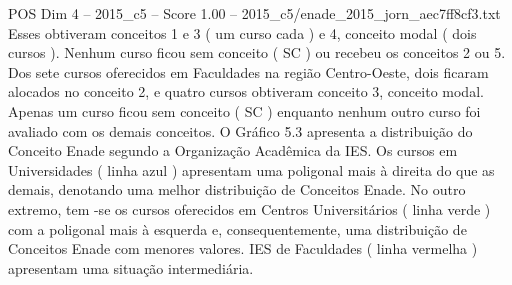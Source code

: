 \begin{textsample}{POS Dim 4 – 2015\_c5 – Score 1.00 – 2015\_c5/enade\_2015\_jorn\_aec7ff8cf3.txt}
Esses obtiveram conceitos 1 e 3 ( um curso cada ) e 4, conceito modal ( dois cursos ).
Nenhum curso ficou sem conceito ( SC ) ou recebeu os conceitos 2 ou 5.
Dos sete cursos oferecidos em Faculdades na região Centro-Oeste, dois ficaram alocados no conceito 2, e quatro cursos obtiveram conceito 3, conceito modal.
Apenas um curso ficou sem conceito ( SC ) enquanto nenhum outro curso foi avaliado com os demais conceitos.
O Gráfico 5.3 apresenta a distribuição do Conceito Enade segundo a Organização Acadêmica da IES.
Os cursos em Universidades ( linha azul ) apresentam uma poligonal mais à direita do que as demais, denotando uma melhor distribuição de Conceitos Enade.
No outro extremo, tem -se os cursos oferecidos em Centros Universitários ( linha verde ) com a poligonal mais à esquerda e, consequentemente, uma distribuição de Conceitos Enade com menores valores.
IES de Faculdades ( linha vermelha ) apresentam uma situação intermediária.

\end{textsample}
